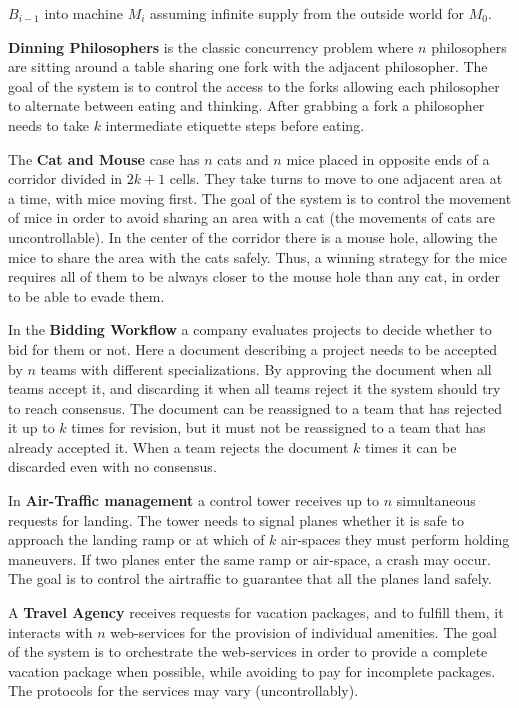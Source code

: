 \begin{description}[align=left,leftmargin=0.7cm,font=\normalfont,style=nextline,itemsep=0pt]
$B_{i -1}$ into machine $M_i$ assuming infinite supply from
the outside world for $M_0$.
\item[DP] \textbf{Dinning Philosophers} is the classic concurrency
problem where $n$ philosophers are sitting around a table sharing
one fork with the adjacent philosopher. The goal of
the system is to control the access to the forks allowing
each philosopher to alternate between eating and thinking.
After grabbing a fork a philosopher needs to take $k$ intermediate
etiquette steps before eating. 
\item[CM] The \textbf{Cat and Mouse} case has $n$ cats
and $n$ mice placed in opposite ends of a corridor
divided in $2k +1$ cells. They take turns to move to one
adjacent area at a time, with mice moving first. The goal
of the system is to control the movement of mice in order
to avoid sharing an area with a cat (the movements of cats
are uncontrollable). In the center of the corridor there is a
mouse hole, allowing the mice to share the area with the
cats safely. Thus, a winning strategy for the mice requires
all of them to be always closer to the mouse hole than any
cat, in order to be able to evade them.
\item[BW] In the \textbf{Bidding Workflow} a company evaluates projects to
decide whether to bid for them or not. Here a
document describing a project needs to be accepted by $n$
teams with different specializations. By approving the
document when all teams accept it, and discarding it when
all teams reject it the system should try to reach consensus. The document can be reassigned to a
team that has rejected it up to $k$ times for revision, but it
must not be reassigned to a team that has already accepted
it. When a team rejects the document $k$ times it can be
discarded even with no consensus.
\item[AT] In \textbf{Air-Traffic management} a control tower receives up to $n$ simultaneous requests for landing. The tower
needs to signal planes whether it is safe to approach the
landing ramp or at which of $k$ air-spaces they must perform
holding maneuvers. If two planes enter the same ramp or
air-space, a crash may occur. The goal is to control the airtraffic to guarantee that all the planes land safely. 
\item[TA] A \textbf{Travel Agency} receives requests for
vacation packages, and to fulfill them, it interacts with $n$
web-services for the provision of individual amenities. The goal
of the system is to orchestrate the web-services in order to
provide a complete vacation package when possible, while
avoiding to pay for incomplete packages. The protocols for
the services may vary (uncontrollably). 
\end{description}
